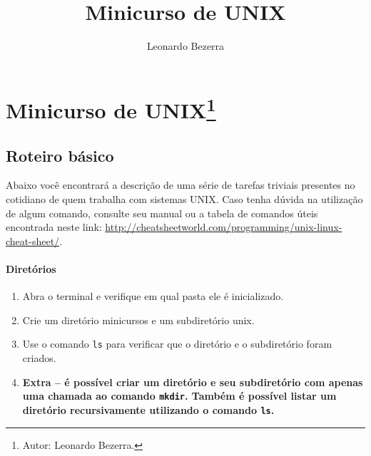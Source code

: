 \documentclass[a4paper,10pt,titlepage,twosided]{book}
\title{Minicurso de UNIX}
\author{Leonardo Bezerra}
\begin{document}
\newcommand{\rights}{\footnote{Autor: Leonardo Bezerra.}}

\newcommand{\gmm}{\texttt{g++}\xspace}
\newcommand{\git}{\texttt{git}\xspace}

\newenvironment{code}
{\verbbox}
{\endverbbox\par\bigskip\colorbox{light-green}{\parbox{\textwidth}{\theverbbox}}\par}

\newenvironment{incode}
{\verbbox}
{\endverbbox\par\colorbox{light-green}{\parbox{\textwidth}{\theverbbox}}\par}

\setcounter{page}{1}
\setcounter{chapter}{1}
\chapter*{Minicurso de UNIX\rights}

\section{Roteiro básico}

Abaixo você encontrará a descrição de uma série de tarefas triviais presentes no cotidiano de quem trabalha com sistemas UNIX. Caso tenha dúvida na utilização de algum comando, consulte seu manual ou a tabela de comandos úteis encontrada neste link: \url{http://cheatsheetworld.com/programming/unix-linux-cheat-sheet/}.

\subsubsection{Diretórios}

\begin{enumerate}
\medskip
\item Abra o terminal e verifique em qual pasta ele é inicializado. 
\item Crie um diretório \textsf{minicursos} e um subdiretório \textsf{unix}.
\item Use o comando \texttt{ls} para verificar que o diretório e o subdiretório foram criados.
\item[] \textbf{Extra -- é possível criar um diretório e seu subdiretório com apenas uma chamada ao comando \texttt{mkdir}. Também é possível listar um diretório recursivamente utilizando o comando \texttt{ls}.}
\end{enumerate}
\end{document}
